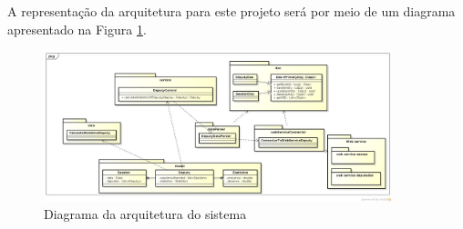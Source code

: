 A representação da arquitetura para este projeto será por meio de um diagrama apresentado na Figura \ref{img:diagrama_arquitetura}.

\begin{figure}[H]
	\centering
	\includegraphics[width=0.9\textwidth]{arquitetura/arquitetura_sprint1}
	\caption{Diagrama da arquitetura do sistema}
	\label{img:diagrama_arquitetura}
\end{figure}